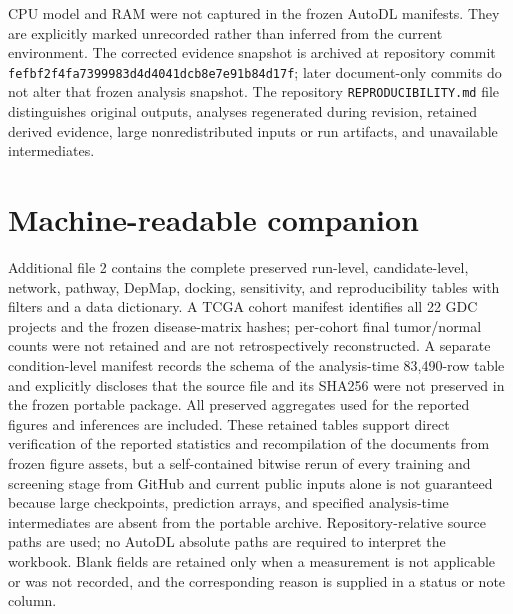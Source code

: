 \documentclass[10pt]{article}
\begin{document}


CPU model and RAM were not captured in the frozen AutoDL manifests. They are explicitly marked unrecorded rather than inferred from the current environment. The corrected evidence snapshot is archived at repository commit \texttt{fefbf2f4fa7399983d4d4041dcb8e7e91b84d17f}; later document-only commits do not alter that frozen analysis snapshot. The repository \texttt{REPRODUCIBILITY.md} file distinguishes original outputs, analyses regenerated during revision, retained derived evidence, large nonredistributed inputs or run artifacts, and unavailable intermediates.

\section{Machine-readable companion}

Additional file 2 contains the complete preserved run-level, candidate-level, network, pathway, DepMap, docking, sensitivity, and reproducibility tables with filters and a data dictionary. A TCGA cohort manifest identifies all 22 GDC projects and the frozen disease-matrix hashes; per-cohort final tumor/normal counts were not retained and are not retrospectively reconstructed. A separate condition-level manifest records the schema of the analysis-time 83,490-row table and explicitly discloses that the source file and its SHA256 were not preserved in the frozen portable package. All preserved aggregates used for the reported figures and inferences are included. These retained tables support direct verification of the reported statistics and recompilation of the documents from frozen figure assets, but a self-contained bitwise rerun of every training and screening stage from GitHub and current public inputs alone is not guaranteed because large checkpoints, prediction arrays, and specified analysis-time intermediates are absent from the portable archive. Repository-relative source paths are used; no AutoDL absolute paths are required to interpret the workbook. Blank fields are retained only when a measurement is not applicable or was not recorded, and the corresponding reason is supplied in a status or note column.
\end{document}
